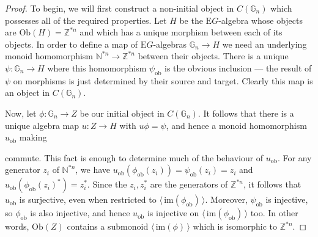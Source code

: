 \documentclass{amsart} %
\newenvironment{eq*}{\begin{equation*}}{\end{equation*}}
\begin{document}
\begin{proof}
To begin, we will first construct a non-initial object in $C(\mathbb{G}_n)$ which possesses all of the required properties. Let $H$ be the $\mathrm{E}G$-algebra whose objects are $\mathrm{Ob}(H) = \mathbb{Z}^{*n}$ and which has a unique morphism between each of its objects. In order to define a map of $\mathrm{E}G$-algebras $\mathbb{G}_n \to H$ we need an underlying monoid homomorphism $\mathbb{N}^{*n} \to \mathbb{Z}^{*n}$ between their objects. There is a unique $\psi: \mathbb{G}_n \to H$ where this homomorphism $\psi_{\mathrm{ob}}$ is the obvious inclusion --- the result of $\psi$ on morphisms is just determined by their source and target. Clearly this map is an object in $C(\mathbb{G}_n)$.

Now, let $\phi: \mathbb{G}_n \to Z$ be our initial object in $C(\mathbb{G}_n)$. It follows that there is a unique algebra map $u: Z \to H$ with $u\phi = \psi$, and hence a monoid homomorphism $u_{\mathrm{ob}}$ making
\begin{eq*} 
\end{eq*}
commute. This fact is enough to determine much of the behaviour of $u_{\mathrm{ob}}$. For any generator $z_i$ of $\mathbb{N}^{*n}$, we have $u_{\mathrm{ob}}(\phi_{\mathrm{ob}}(z_i)) = \psi_{\mathrm{ob}}(z_i) = z_i$ and $u_{\mathrm{ob}}(\phi_{\mathrm{ob}}(z_i)^*) = z_i^*$. Since the $z_i, z_i^*$ are the generators of $\mathbb{Z}^{*n}$, it follows that $u_{\mathrm{ob}}$ is surjective, even when restricted to $\langle \, \mathrm{im}(\phi_{\mathrm{ob}}) \, \rangle$. Moreover, $\psi_{\mathrm{ob}}$ is injective, so $\phi_{\mathrm{ob}}$ is also injective, and hence $u_{\mathrm{ob}}$ is injective on $\langle \, \mathrm{im}(\phi_{\mathrm{ob}}) \, \rangle$ too. In other words, $\mathrm{Ob}(Z)$ contains a submonoid $\langle \, \mathrm{im}(\phi) \, \rangle$ which is isomorphic to $\mathbb{Z}^{*n}$. 


\end{proof}
\end{document}
